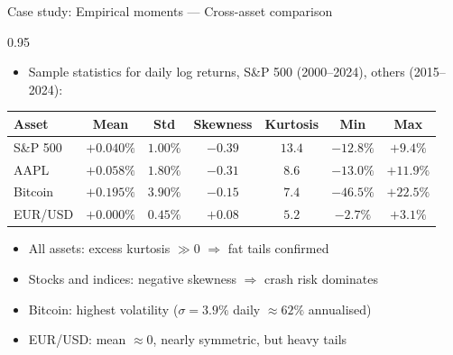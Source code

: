 \documentclass[9pt, aspectratio=169, t]{beamer}
\begin{document}
\begin{frame}{Case study: Empirical moments --- Cross-asset comparison}
    \begin{cminipage}{0.95\textwidth}
    \begin{itemize}\setlength{\itemsep}{0pt}
        \item Sample statistics for daily log returns, S\&P 500 (2000--2024), others (2015--2024):
    \end{itemize}
    \vspace{0.1cm}
    \begin{center}
    {\small
    \renewcommand{\arraystretch}{1.3}
    \begin{tabular}{lcccccc}
    \toprule
    \textbf{Asset} & \textbf{Mean} & \textbf{Std} & \textbf{Skewness} & \textbf{Kurtosis} & \textbf{Min} & \textbf{Max} \\
    \midrule
    S\&P 500 & $+0.040\%$ & $1.00\%$ & $-0.39$ & $13.4$ & $-12.8\%$ & $+9.4\%$ \\
    AAPL     & $+0.058\%$ & $1.80\%$ & $-0.31$ & $8.6$  & $-13.0\%$ & $+11.9\%$ \\
    Bitcoin  & $+0.195\%$ & $3.90\%$ & $-0.15$ & $7.4$  & $-46.5\%$ & $+22.5\%$ \\
    EUR/USD  & $+0.000\%$ & $0.45\%$ & $+0.08$ & $5.2$  & $-2.7\%$  & $+3.1\%$ \\
    \bottomrule
    \end{tabular}
    }
    \end{center}
    \vspace{0.1cm}
    \begin{itemize}\setlength{\itemsep}{0pt}
        \item All assets: excess kurtosis $\gg 0$ $\Rightarrow$ fat tails confirmed
        \item Stocks and indices: negative skewness $\Rightarrow$ crash risk dominates
        \item Bitcoin: highest volatility ($\sigma = 3.9\%$ daily $\approx 62\%$ annualised)
        \item EUR/USD: mean $\approx 0$, nearly symmetric, but heavy tails
    \end{itemize}
    \end{cminipage}
\end{frame}

\end{document}
